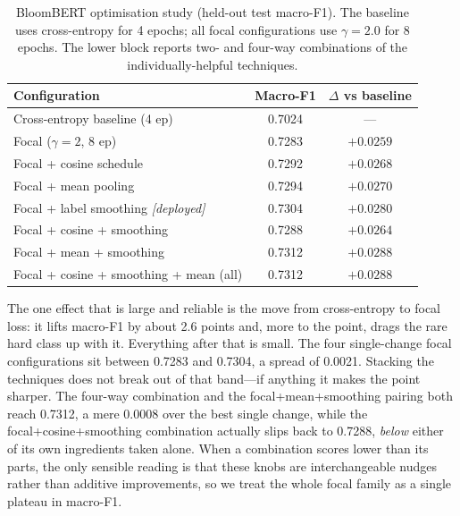 \documentclass[12pt,a4paper]{report}
\begin{document}
\begin{table}[ht]
\centering
\caption{BloomBERT optimisation study (held-out test macro-F1). The baseline uses
cross-entropy for 4 epochs; all focal configurations use $\gamma=2.0$ for 8
epochs. The lower block reports two- and four-way combinations of the
individually-helpful techniques.}
\label{tab:ablation}
\begin{tabular}{lcc}
\toprule
\textbf{Configuration} & \textbf{Macro-F1} & \textbf{$\Delta$ vs baseline} \\
\midrule
Cross-entropy baseline (4 ep)              & 0.7024 & --- \\
Focal ($\gamma=2$, 8 ep)                    & 0.7283 & $+0.0259$ \\
Focal + cosine schedule                    & 0.7292 & $+0.0268$ \\
Focal + mean pooling                       & 0.7294 & $+0.0270$ \\
Focal + label smoothing \emph{[deployed]}  & 0.7304 & $+0.0280$ \\
\midrule
Focal + cosine + smoothing                 & 0.7288 & $+0.0264$ \\
Focal + mean + smoothing                   & 0.7312 & $+0.0288$ \\
Focal + cosine + smoothing + mean (all)    & 0.7312 & $+0.0288$ \\
\bottomrule
\end{tabular}
\end{table}

The one effect that is large and reliable is the move from cross-entropy to focal
loss: it lifts macro-F1 by about 2.6 points and, more to the point, drags the
rare hard class up with it. Everything after that is small. The four
single-change focal configurations sit between 0.7283 and 0.7304, a spread of
0.0021. Stacking the techniques does not break out of that band---if anything it
makes the point sharper. The four-way combination and the focal+mean+smoothing
pairing both reach 0.7312, a mere 0.0008 over the best single change, while the
focal+cosine+smoothing combination actually slips back to 0.7288, \emph{below}
either of its own ingredients taken alone. When a combination scores lower than
its parts, the only sensible reading is that these knobs are interchangeable
nudges rather than additive improvements, so we treat the whole focal family as a
single plateau in macro-F1.
\end{document}
